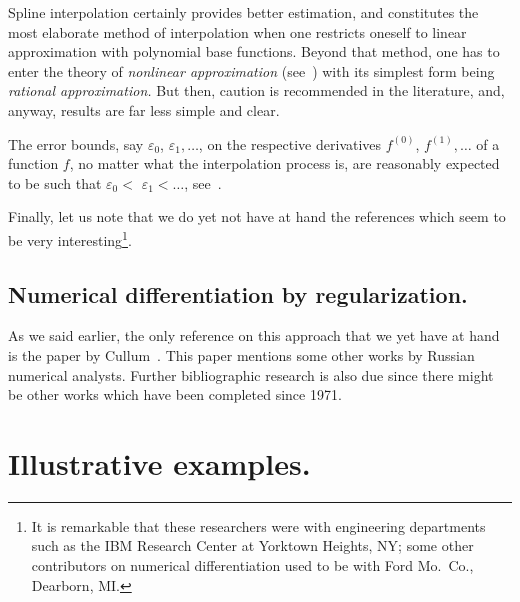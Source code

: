 Spline interpolation certainly provides better estimation, and constitutes
the most elaborate method of interpolation when one restricts oneself to
linear approximation with polynomial base functions.
Beyond that method, one has to enter the theory of {\it nonlinear
approximation} (see~\cite{rice1965}) with its simplest form being {\it
rational approximation.}
But then, caution is recommended in the literature,
and, anyway, results are far less simple and clear.

The error bounds, say $\varepsilon_0$, $\varepsilon_1, \ldots$, on the
respective derivatives $f^{(0)}$, $f^{(1)}, \ldots$ of a function $f$,
no matter what the interpolation process is, are reasonably
expected to be such that $\varepsilon_0 <$ $\varepsilon_1 < \ldots$,
see~\cite{czipszer1958}.

Finally, let us note that we do yet not have at hand the references
\cite{newman0000,anderssen1972} which seem to be very
interesting\footnote{It is remarkable that these
researchers were with engineering departments such as the IBM
Research Center at Yorktown Heights, NY; some other contributors on
numerical differentiation used to be with Ford Mo.~Co., Dearborn, MI.}.

\subsection{Numerical differentiation by regularization.}
As we said earlier, the only reference on this approach that we yet have at
hand is the paper by Cullum~\cite{cullum1971}.
This paper mentions some other works by Russian numerical analysts.
Further bibliographic research is also due since there might be other
works which have been completed since 1971.


\section{Illustrative examples.}\setcounter{equation}{0}
\label{examples}

